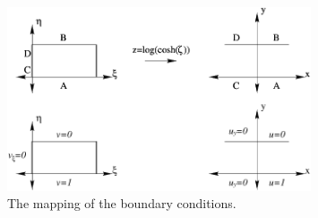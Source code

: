 {\begin{Solution}
  \begin{figure}[h!]
    \begin{center}
      \includegraphics[width=0.8\textwidth]{pde/conformal/sis2is}
    \end{center}
    \caption{The mapping of the boundary conditions.}
    \label{sis2is}
  \end{figure}


\end{Solution}}

